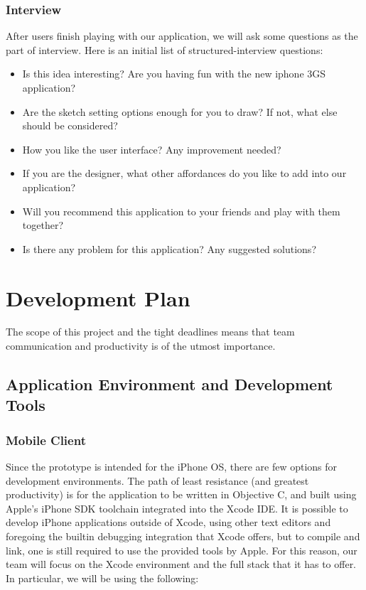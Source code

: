 \documentclass{article}
\begin{document}
\subsubsection{Interview}

After users finish playing with our application, we will ask some questions as
the part of interview.  Here is an initial list of structured-interview
questions:
\begin{itemize}
\item Is this idea interesting? Are you having fun with the new iphone 3GS application?
\item Are the sketch setting options enough for you to draw? If not, what else should be considered?
\item How you like the user interface? Any improvement needed?
\item If you are the designer, what other affordances do you like to add into our application?
\item Will you recommend this application to your friends and play with them together?
\item Is there any problem for this application? Any suggested solutions?
\end{itemize}




\section{Development Plan}

The scope of this project and the tight deadlines means that team communication
and productivity is of the utmost importance.

\subsection{ Application Environment and Development Tools }

\subsubsection{ Mobile Client }

Since the prototype is intended for the iPhone OS, there are few options for
development environments.  The path of least resistance (and greatest
productivity) is for the application to be written in Objective C, and built
using Apple's iPhone SDK toolchain integrated into the Xcode IDE.  It is
possible to develop iPhone applications outside of Xcode, using other text
editors and foregoing the builtin debugging integration that Xcode offers, but
to compile and link, one is still required to use the provided tools by Apple.
For this reason, our team will focus on the Xcode environment and the full
stack that it has to offer.  In particular, we will be using the following:
\end{document}
